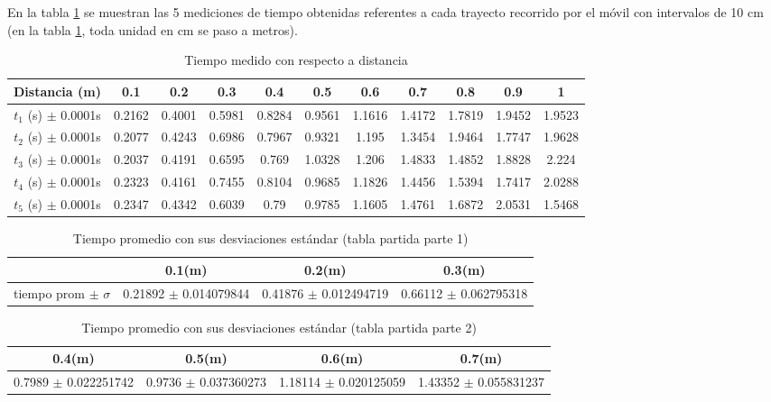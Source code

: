 \documentclass{article}
\begin{document}
En la tabla \ref{Tabla:1} se muestran las 5 mediciones de tiempo obtenidas referentes a cada trayecto recorrido por el móvil con intervalos de 10 cm (en la tabla \ref{Tabla:1}, toda unidad en cm se paso a metros).
\begin{table}[H]
	\centering
	\begin{tabular}{|c|c|c|c|c|c|c|c|c|c|c|}
	\hline
	Distancia (m) & 0.1 & 0.2 & 0.3 & 0.4 & 0.5 & 0.6 & 0.7 & 0.8 & 0.9 & 1 \\
	\hline
	$t_1$ (s) $\pm$ 0.0001s & 0.2162 & 0.4001 & 0.5981 & 0.8284 & 0.9561 & 1.1616 & 1.4172 & 1.7819 & 1.9452 & 1.9523 \\
	\hline
	$t_2$ (s) $\pm$ 0.0001s & 0.2077 & 0.4243 & 0.6986 & 0.7967 & 0.9321 & 1.195 & 1.3454 & 1.9464 & 1.7747 & 1.9628 \\
	\hline
	$t_3$ (s) $\pm$ 0.0001s & 0.2037 & 0.4191 & 0.6595 & 0.769 & 1.0328 & 1.206 & 1.4833 & 1.4852 & 1.8828 & 2.224 \\
	\hline
	$t_4$ (s) $\pm$ 0.0001s & 0.2323 & 0.4161 & 0.7455 & 0.8104 & 0.9685 & 1.1826 & 1.4456 & 1.5394 & 1.7417 & 2.0288 \\
	\hline
	$t_5$ (s) $\pm$ 0.0001s & 0.2347 & 0.4342 & 0.6039 & 0.79 & 0.9785 & 1.1605 & 1.4761 & 1.6872 & 2.0531 & 1.5468 \\
	\hline
	\end{tabular}
	\caption{Tiempo medido con respecto a distancia}
	\label{Tabla:1}
\end{table}

	\begin{table}[H]
		\centering
		\begin{tabular}{|c|c|c|c|}
			\hline
			& 0.1(m) & 0.2(m) & 0.3(m)\\
			\hline
			tiempo prom $\pm$ $\sigma$ & 0.21892 $\pm$ 0.014079844 & 0.41876 $\pm$ 0.012494719 & 0.66112 $\pm$ 0.062795318 \\
			\hline
	\end{tabular}
	\caption{Tiempo promedio con sus desviaciones estándar (tabla partida parte 1)}
	\label{Tabla:2}
\end{table}



	\begin{table}[H]
		\centering
		\begin{tabular}{|c|c|c|c|}
			\hline
		 	0.4(m) & 0.5(m) & 0.6(m) & 0.7(m) \\ 
			\hline
			0.7989 $\pm$ 0.022251742 & 0.9736 $\pm$ 0.037360273 & 1.18114 $\pm$ 0.020125059 & 1.43352 $\pm$ 0.055831237 \\
			\hline
		\end{tabular}
		\caption{ Tiempo promedio con sus desviaciones estándar (tabla partida parte 2)}
		\label{Tabla:2}
	\end{table}
\end{document}

